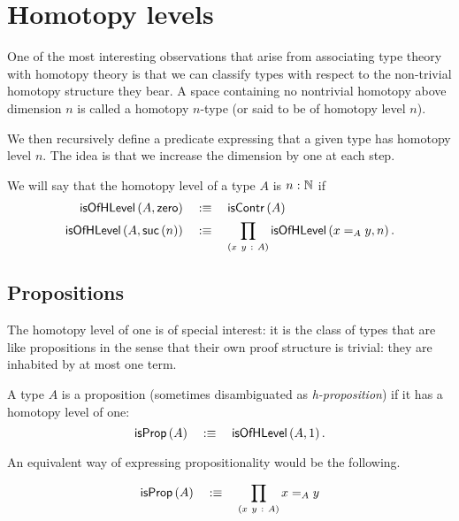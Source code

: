 \section{Homotopy levels}

One of the most interesting observations that arise from associating type theory with
homotopy theory is that we can classify types with respect to the non-trivial homotopy
structure they bear. A space containing no nontrivial homotopy above dimension $n$ is
called a homotopy $n$-type (or said to be of homotopy level $n$).

We then recursively define a predicate expressing that a given type has homotopy level
$n$. The idea is that we increase the dimension by one at each step.
\begin{defn}
  We will say that the homotopy level of a type $A$ is $n\hspace{0.1mm}:\hspace{0.1mm}\mathbb{N}$ if
  \begin{align*}
    \mathsf{isOfHLevel}\left(A, \mathsf{zero}{}\right) &\quad:\equiv\quad \mathsf{isContr}\left(A\right)\\
    \mathsf{isOfHLevel}\left(A, \mathsf{suc}\left(n\right)\right) &\quad:\equiv\quad \prod_{(x~y~:~A)} \mathsf{isOfHLevel}\left(x =_A y, n\right).
  \end{align*}
\end{defn}

\subsection{Propositions}

The homotopy level of one is of special interest: it is the class of types that are like
propositions in the sense that their own proof structure is trivial: they are inhabited by
at most one term.

\begin{defn}[Proposition]\label{defn:prop'}
  A type $A$ is a proposition (sometimes disambiguated as \emph{h-proposition}) if it has
  a homotopy level of one:
  \begin{equation*}
    \mathsf{isProp}\left(A\right) \quad:\equiv\quad \mathsf{isOfHLevel}\left(A, 1\right).
  \end{equation*}
\end{defn}

An equivalent way of expressing propositionality would be the following.
\begin{defn}\label{defn:hprop}
  \begin{equation*}
    \mathsf{isProp}\left(A\right) \quad:\equiv\quad \prod_{(x~y~:~A)} x =_A y
  \end{equation*}
\end{defn}

